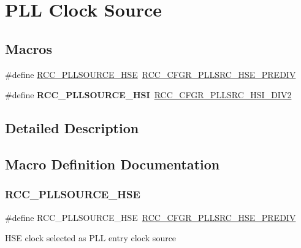 \hypertarget{group___r_c_c___p_l_l___clock___source}{}\section{P\+LL Clock Source}
\label{group___r_c_c___p_l_l___clock___source}
\subsection*{Macros}
\begin{DoxyCompactItemize}
\item 
\#define \hyperlink{group___r_c_c___p_l_l___clock___source_ga197cea7fe5c2db26fe7fcdb0f99dd4d7}{R\+C\+C\+\_\+\+P\+L\+L\+S\+O\+U\+R\+C\+E\+\_\+\+H\+SE}~\hyperlink{group___peripheral___registers___bits___definition_ga6088620a3c2162915b628cd7a4492579}{R\+C\+C\+\_\+\+C\+F\+G\+R\+\_\+\+P\+L\+L\+S\+R\+C\+\_\+\+H\+S\+E\+\_\+\+P\+R\+E\+D\+IV}
\item 
\mbox{\label{group___r_c_c___p_l_l___clock___source_ga0e07703f1ccb3d60f8a47a2dc631c218}} 
\#define {\bfseries R\+C\+C\+\_\+\+P\+L\+L\+S\+O\+U\+R\+C\+E\+\_\+\+H\+SI}~\hyperlink{group___peripheral___registers___bits___definition_gabf9663a4607082db6e39894950087850}{R\+C\+C\+\_\+\+C\+F\+G\+R\+\_\+\+P\+L\+L\+S\+R\+C\+\_\+\+H\+S\+I\+\_\+\+D\+I\+V2}
\end{DoxyCompactItemize}


\subsection{Detailed Description}


\subsection{Macro Definition Documentation}
\mbox{\label{group___r_c_c___p_l_l___clock___source_ga197cea7fe5c2db26fe7fcdb0f99dd4d7}} 
\subsubsection{\texorpdfstring{R\+C\+C\+\_\+\+P\+L\+L\+S\+O\+U\+R\+C\+E\+\_\+\+H\+SE}{RCC\_PLLSOURCE\_HSE}}
{\footnotesize\ttfamily \#define R\+C\+C\+\_\+\+P\+L\+L\+S\+O\+U\+R\+C\+E\+\_\+\+H\+SE~\hyperlink{group___peripheral___registers___bits___definition_ga6088620a3c2162915b628cd7a4492579}{R\+C\+C\+\_\+\+C\+F\+G\+R\+\_\+\+P\+L\+L\+S\+R\+C\+\_\+\+H\+S\+E\+\_\+\+P\+R\+E\+D\+IV}}

H\+SE clock selected as P\+LL entry clock source 